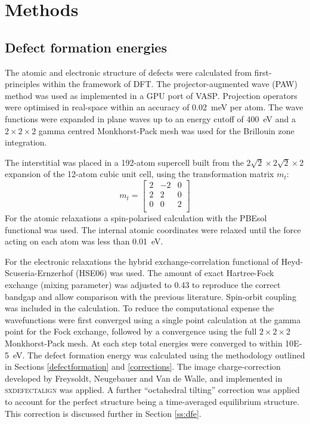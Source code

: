 \section{Methods}

\subsection{Defect formation energies} \label{method:dfe}

The atomic and electronic structure of defects were calculated from first-principles within the framework of DFT. The projector-augmented wave (PAW) method\autocite{Blochl1994} was used as implemented in a GPU port of \textsc{VASP}.\autocite{Kresse1996a} Projection operators were optimised in real-space within an accuracy of \SI{0.02}{\milli\electronvolt} per atom. The wave functions were expanded in plane waves up to an energy cutoff of \SI{400}{\electronvolt} and a $2\! \times\! 2\! \times\! 2$ gamma centred Monkhorst-Pack mesh was used for the Brillouin zone integration.

The interstitial was placed in a 192-atom supercell built from the $2\sqrt2\times2\sqrt2\times2$ expansion of the 12-atom cubic unit cell, using the transformation matrix $m_t$:
$$
m_t = \begin{bmatrix}
2 & -2 & 0 \\
2 & 2 & 0 \\
0 & 0 & 2 \\
\end{bmatrix}
$$
For the atomic relaxations a spin-polarised calculation with the PBEsol functional was used.\autocite{Perdew2008a} The internal atomic coordinates were relaxed until the force acting on each atom was less than \SI{0.01}{eV}. 

For the electronic relaxations the hybrid exchange-correlation functional of Heyd-Scuseria-Ernzerhof (HSE06) was used.\autocite{Heyd2004a,Heyd2005a} The amount of exact Hartree-Fock exchange (mixing parameter) was adjusted to 0.43 to reproduce the correct bandgap and allow comparison with the previous literature.\autocite{Meggiolaro2018,Du2015} 
Spin-orbit coupling was included in the calculation.
To reduce the computational expense the wavefunctions were first converged using a single point calculation at the gamma point for the Fock exchange, followed by a convergence using the full $2\! \times\! 2\! \times\! 2$ Monkhorst-Pack mesh. At each step total energies were converged to within \SI{10E-5}{\electronvolt}.
The defect formation energy was calculated using the methodology outlined in Sections \ref{defectformation} and \ref{corrections}. The image charge-correction developed by Freysoldt, Neugebauer and Van de Walle, and implemented in \textsc{sxdefectalign} was applied. A further ``octahedral tilting'' correction was applied to account for the perfect structure being a time-averaged equilibrium structure. This correction is discussed further in Section \ref{ss:dfe}.


